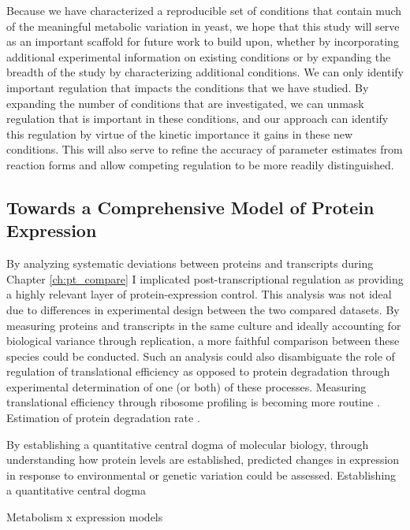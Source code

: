 Because we have characterized a reproducible set of conditions that contain much of the meaningful metabolic variation in yeast, we hope that this study will serve as an important scaffold for future work to build upon, whether by incorporating additional experimental information on existing conditions or by expanding the breadth of the study by characterizing additional conditions. We can only identify important regulation that impacts the conditions that we have studied. By expanding the number of conditions that are investigated, we can unmask regulation that is important in these conditions, and our approach can identify this regulation by virtue of the kinetic importance it gains in these new conditions. This will also serve to refine the accuracy of parameter estimates from reaction forms and allow competing regulation to be more readily distinguished.



\subsection{Towards a Comprehensive Model of Protein Expression}

By analyzing systematic deviations between proteins and transcripts during Chapter \ref{ch:pt_compare} I implicated post-transcriptional regulation as providing a highly relevant layer of protein-expression control. This analysis was not ideal due to differences in experimental design between the two compared datasets. By measuring proteins and transcripts in the same culture and ideally accounting for biological variance through replication, a more faithful comparison between these species could be conducted.  Such an analysis could also disambiguate the role of regulation of translational efficiency as opposed to protein degradation through experimental determination of one (or both) of these processes. Measuring translational efficiency through ribosome profiling is becoming more routine   . Estimation of protein degradation rate   .

By establishing a quantitative central dogma of molecular biology, through understanding how protein levels are established, predicted changes in expression in response to environmental or genetic variation could be assessed. 
Establishing a quantitative central dogma

Metabolism x expression models


